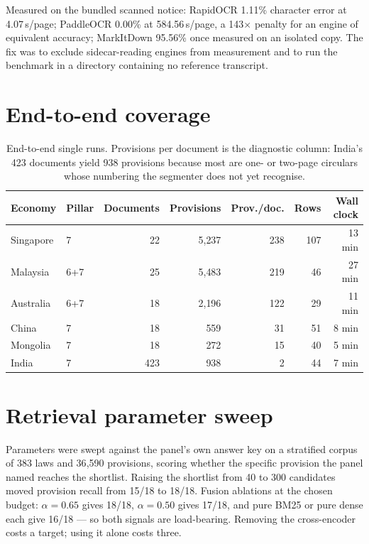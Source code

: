 \documentclass{article}
\begin{document}
Measured on the bundled scanned notice: RapidOCR 1.11\% character error at
4.07\,s/page; PaddleOCR 0.00\% at 584.56\,s/page, a 143$\times$ penalty for an
engine of equivalent accuracy; MarkItDown 95.56\% once measured on an isolated
copy. The fix was to exclude sidecar-reading engines from measurement and to run
the benchmark in a directory containing no reference transcript.

\section{End-to-end coverage}
\label{app:coverage}

\begin{table}[h]
\centering
\caption{End-to-end single runs. Provisions per document is the diagnostic
column: India's 423 documents yield 938 provisions because most are one- or
two-page circulars whose numbering the segmenter does not yet recognise.}
\label{tab:coverage}
\small
\begin{tabular}{llrrrrr}
\toprule
Economy & Pillar & Documents & Provisions & Prov./doc. & Rows & Wall clock \\
\midrule
Singapore & 7   & 22  & 5{,}237 & 238 & 107 & 13 min \\
Malaysia  & 6+7 & 25  & 5{,}483 & 219 & 46  & 27 min \\
Australia & 6+7 & 18  & 2{,}196 & 122 & 29  & 11 min \\
China     & 7   & 18  & 559     & 31  & 51  & 8 min  \\
Mongolia  & 7   & 18  & 272     & 15  & 40  & 5 min  \\
India     & 7   & 423 & 938     & 2   & 44  & 7 min  \\
\bottomrule
\end{tabular}
\end{table}

\section{Retrieval parameter sweep}
\label{app:sweep}

Parameters were swept against the panel's own answer key on a stratified corpus
of 383 laws and 36{,}590 provisions, scoring whether the specific provision the
panel named reaches the shortlist. Raising the shortlist from 40 to 300
candidates moved provision recall from 15/18 to 18/18. Fusion ablations at the
chosen budget: $\alpha=0.65$ gives 18/18, $\alpha=0.50$ gives 17/18, and pure
BM25 or pure dense each give 16/18 --- so both signals are load-bearing.
Removing the cross-encoder costs a target; using it alone costs three.
\end{document}
